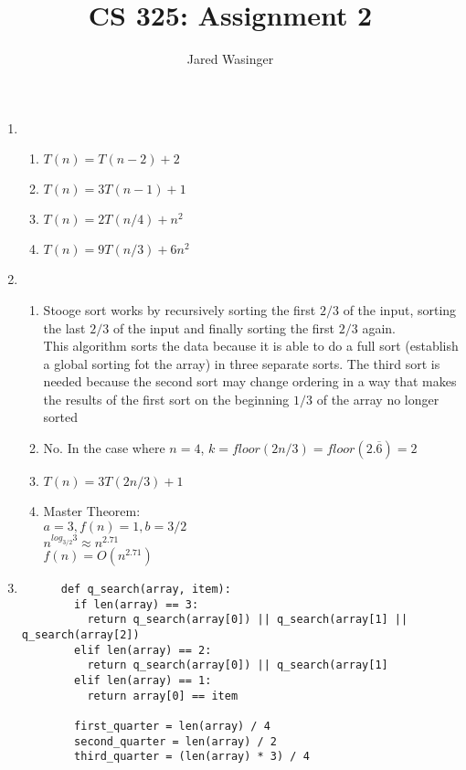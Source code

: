 \documentclass{article}
\begin{document}
\title{CS 325: Assignment 2}
\author{Jared Wasinger}

\maketitle

  \begin{enumerate}
    \item\begin{enumerate}
      \item $T(n) = T(n-2) + 2$
      \item $T(n) = 3T(n-1) + 1$
      \item $T(n) = 2T(n/4) + n^2$
      \item $T(n) = 9T(n/3) + 6n^2$
    \end{enumerate}
    \item\begin{enumerate}
      \item Stooge sort works by recursively sorting the first $2/3$ of the input, sorting the last $2/3$ of the input and finally sorting the first $2/3$ again.\\
      This algorithm sorts the data because it is able to do a full sort (establish a global sorting fot the array) in three separate sorts.  The third sort is needed because the second sort may change ordering in a way that makes the results of the first sort on the beginning $1/3$ of the array no longer sorted
      \item No.  In the case where $n=4$, $k = floor(2n/3) = floor(2.\overline{6}) = 2$
      \item $T(n) = 3T(2n/3) + 1$
      \item Master Theorem:\\ 
        $a=3, f(n)=1, b=3/2$\\
        $n^{log_{3/2}3} \approx n^{2.71}$\\
        $f(n) = O(n^{2.71})$
    \end{enumerate}
    \item\begin{verbatim}
      def q_search(array, item):
        if len(array) == 3:
          return q_search(array[0]) || q_search(array[1] || q_search(array[2])
        elif len(array) == 2:
          return q_search(array[0]) || q_search(array[1]
        elif len(array) == 1:
          return array[0] == item

        first_quarter = len(array) / 4
        second_quarter = len(array) / 2
        third_quarter = (len(array) * 3) / 4


\end{verbatim}
\end{enumerate}
\end{document}
